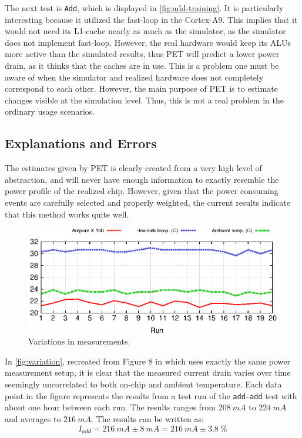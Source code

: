 The next test is \texttt{Add}, which is displayed in \autoref{fig:add-training}.
It is particularly interesting because it utilized the fast-loop in the
Cortex-A9. This implies that it would not need its L1-cache nearly as much as
the simulator, as the simulator does not implement fast-loop. However, the real
hardware would keep its ALUs more active than the simulated results, thus PET
will predict a lower power drain, as it thinks that the caches are in use. This
is a problem one must be aware of when the simulator and realized hardware does
not completely correspond to each other. However, the main purpose of PET is to
estimate changes visible at the simulation level. Thus, this is not a real
problem in the ordinary usage scenarios.


\subsection{Explanations and Errors}

The estimates given by PET is clearly created from a very high level of
abstraction, and will never have enough information to exactly resemble the
power profile of the realized chip. However, given that the power consuming
events are carefully selected and properly weighted, the current results
indicate that this method works quite well.

\begin{figure}[ht]
    \includegraphics{figs/heat}
    \caption{Variations in measurements.}
    \label{fig:variation}
\end{figure}

In \autoref{fig:variation}, recreated from Figure 8 in
\cite{rundehvatum2013exploring} which uses exactly the same power measurement
setup, it is clear that the measured current drain varies over time seemingly
uncorrelated to both on-chip and ambient temperature. Each data point in the
figure represents the results from a test run of the \texttt{add-add} test with
about one hour between each run. The results ranges from $208~mA$ to $224~mA$
and averages to $216~mA$. The results can be written as:
\[
    I_{add} = 216~mA\pm8~mA = 216~mA\pm3.8~\%
\]

